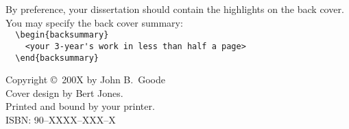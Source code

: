 {\pagestyle{empty}
\par\vskip 2cm
\begin{backsummary}
By preference, your dissertation should contain the highlights on the back cover. You may specify
the back cover summary:\\[2ex]
\verb|  \begin{backsummary}|\\
\verb|    <your 3-year's work in less than half a page>|\\
\verb|  \end{backsummary}|
\end{backsummary}
\begin{center}
\par\vspace {2cm}
\par\vspace {1cm}
\noindent%
\fublogo{9cm}
\end{center}
\vfill

%
\noindent%
Copyright \copyright\ 200X by John B.\ Goode\\[2ex] %
Cover design by Bert Jones.\\                       %
Printed and bound by your printer.\\[2ex]           %
ISBN: 90--XXXX--XXX--X                              %


} %

